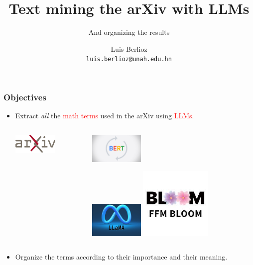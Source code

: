 \documentclass[10pt]{beamer}
\title{Text mining the arXiv with LLMs}
\subtitle{And organizing the results}
\author{Luis Berlioz\\
\texttt{luis.berlioz@unah.edu.hn}}
\institute{Universidad Nacional Autónoma de Honduras}
\newcommand{\arxiv}{arXiv}
\begin{document}
\begin{frame}
\titlepage
\end{frame}


\begin{frame}
    \frametitle{Objectives}
    \begin{itemize}
        \item Extract \emph{all} the \textcolor<2>{red}{math terms}  used in the \arxiv{} using \textcolor<3>{red}{LLMs}.
            \begin{columns}
                \begin{column}{0.5\textwidth}
            \begin{center}
                \includegraphics[width=0.6\textwidth]{../Images/ArXiv_logo_2022.svg.png}
            \end{center}
        \end{column}

        \begin{column}{0.5\textwidth}
        \includegraphics[width=0.3\textwidth]{../Images/Google_BERT_v1.jpg}

        \includegraphics[width=0.3\textwidth]{../Images/llama.png}
        \includegraphics[width=0.4\textwidth]{../Images/download.jpeg}

        \end{column}
    \end{columns}
        \item Organize the terms   according to their importance and their meaning.   
    \end{itemize}
\end{frame}
\end{document}
